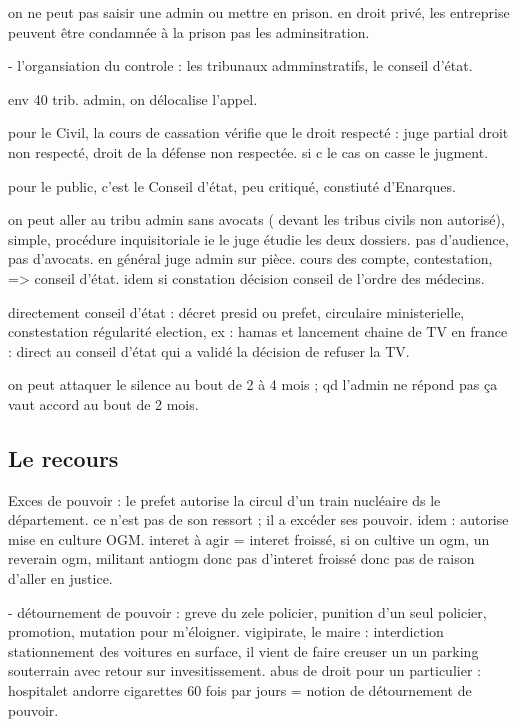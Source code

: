 \documentclass[a4paper,12pt]{article}
\begin{document}
on ne peut pas saisir une admin ou mettre en prison. en droit privé, les entreprise peuvent être condamnée à la prison
pas les adminsitration.  


- l'organsiation du controle : les tribunaux admminstratifs, le conseil d'état.

env 40 trib. admin, on délocalise l'appel.

pour le Civil, la cours de cassation vérifie que le droit respecté : juge partial droit non respecté, droit de la défense non respectée.
si c le cas on casse le jugment.

pour le public, c'est le Conseil d'état, peu critiqué, constiuté d'Enarques.

on peut aller au tribu admin sans avocats ( devant les tribus civils non autorisé), simple, procédure inquisitoriale ie
le juge étudie les deux dossiers. pas d'audience, pas d'avocats. en général juge admin sur pièce. cours des compte, contestation, => conseil d'état. idem si constation décision conseil de l'ordre des médecins.

directement conseil d'état : décret presid ou prefet, circulaire ministerielle, constestation régularité election,
ex : hamas et lancement chaine de TV en france : direct au conseil d'état qui a validé la décision de refuser la TV.

on peut attaquer le silence au bout de 2 à 4 mois ; qd l'admin ne répond pas ça vaut accord au bout de 2 mois.




\subsection{Le recours}


Exces de pouvoir : le prefet autorise la circul d'un train nucléaire ds le département. ce n'est pas de son ressort ; il a excéder ses pouvoir. idem : autorise mise en culture OGM. interet à agir = interet froissé, si on cultive un ogm, un reverain ogm, militant antiogm donc pas d'interet froissé donc pas de raison d'aller en justice.


- détournement de pouvoir : greve du zele policier, punition d'un seul policier, promotion, mutation pour m'éloigner.
vigipirate, le maire : interdiction stationnement des voitures en surface, il vient de faire creuser un un parking souterrain avec retour sur invesitissement. abus de droit pour un particulier : hospitalet andorre cigarettes 60 fois par jours = notion de détournement de pouvoir.
\end{document}
